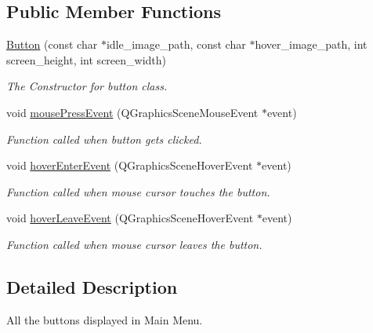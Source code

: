 \subsection*{Public Member Functions}
\begin{DoxyCompactItemize}
\item 
\hyperlink{classButton_abbf00c9df181d84d36e915ef712e024c}{Button} (const char $\ast$idle\-\_\-image\-\_\-path, const char $\ast$hover\-\_\-image\-\_\-path, int screen\-\_\-height, int screen\-\_\-width)
\begin{DoxyCompactList}\small\item\em The Constructor for button class. \end{DoxyCompactList}\item 
void \hyperlink{classButton_a17d8eb0c904605b223bbc00c75655315}{mouse\-Press\-Event} (Q\-Graphics\-Scene\-Mouse\-Event $\ast$event)
\begin{DoxyCompactList}\small\item\em Function called when button gets clicked. \end{DoxyCompactList}\item 
void \hyperlink{classButton_a633a9684818bc5d300a622a00064f09c}{hover\-Enter\-Event} (Q\-Graphics\-Scene\-Hover\-Event $\ast$event)
\begin{DoxyCompactList}\small\item\em Function called when mouse cursor touches the button. \end{DoxyCompactList}\item 
void \hyperlink{classButton_a1689a97690d9469ce8350d24db0d7485}{hover\-Leave\-Event} (Q\-Graphics\-Scene\-Hover\-Event $\ast$event)
\begin{DoxyCompactList}\small\item\em Function called when mouse cursor leaves the button. \end{DoxyCompactList}\end{DoxyCompactItemize}


\subsection{Detailed Description}
All the buttons displayed in Main Menu. 

